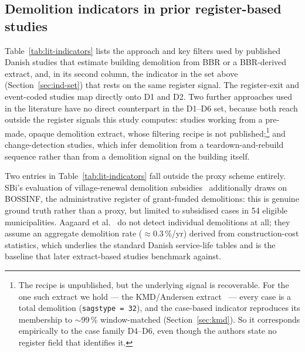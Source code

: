\subsection{Demolition indicators in prior register-based studies}\label{sec:lit-indicators}

Table~\ref{tab:lit-indicators} lists the approach and key filters used
by published Danish studies that estimate building demolition from BBR or
a BBR-derived extract, and, in its second column, the indicator in the
set above (Section~\ref{sec:ind-set}) that rests on the same register
signal. The register-exit and event-coded studies map directly onto D1
and D2. Two further approaches used in the literature have no direct
counterpart in the D1--D6 set, because both reach outside the register
signals this study computes: studies working from a pre-made, opaque
demolition extract, whose filtering recipe is not
published;\footnote{The recipe is unpublished, but the underlying signal is
recoverable. For the one such extract we hold --- the KMD/Andersen
extract~\cite{andersen2022adaptation} --- every case is a total demolition
(\texttt{sagstype = 32}), and the case-based indicator reproduces its
membership to $\sim$99\,\% window-matched (Section~\ref{sec:kmd}). So it
corresponds empirically to the case family D4--D6, even though the authors
state no register field that identifies it.} and change-detection studies,
which infer demolition from a teardown-and-rebuild sequence rather than
from a demolition signal on the building itself.

Two entries in Table~\ref{tab:lit-indicators} fall outside the proxy
scheme entirely. SBi's evaluation of village-renewal demolition
subsidies~\cite{jensen2019landsbyfornyelse} additionally draws on
BOSSINF, the administrative register of grant-funded demolitions: this
is genuine ground truth rather than a proxy, but limited to subsidised
cases in 54 eligible municipalities. Aagaard et
al.~\cite{aagaard2013levetider} do not detect individual demolitions at
all; they assume an aggregate demolition rate ($\approx$0.3\,\%/yr)
derived from construction-cost statistics, which underlies the standard
Danish service-life tables and is the baseline that later extract-based
studies benchmark against.

